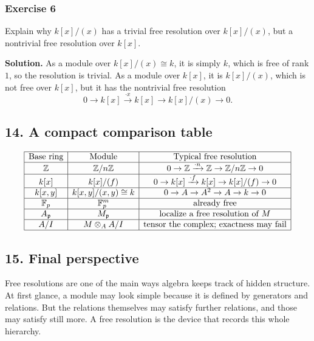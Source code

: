 \documentclass[12pt,a4paper]{article}
\theoremstyle{notespace}
\theoremstyle{definition}
\begin{document}
\subsubsection*{Exercise 6}
Explain why \(k[x]/(x)\) has a trivial free resolution over \(k[x]/(x)\), but a nontrivial free resolution over \(k[x]\).

\textbf{Solution.}
As a module over \(k[x]/(x)\cong k\), it is simply \(k\), which is free of rank \(1\), so the resolution is trivial.
As a module over \(k[x]\), it is \(k[x]/(x)\), which is not free over \(k[x]\), but it has the nontrivial free resolution
\[
0 \longrightarrow k[x] \xrightarrow{\cdot x} k[x] \longrightarrow k[x]/(x) \longrightarrow 0.
\]

\subsection{14. A compact comparison table}

\[
\begin{array}{|c|c|c|}
	\hline
	\text{Base ring} & \text{Module} & \text{Typical free resolution} \\
	\hline
	\mathbb Z & \mathbb Z/n\mathbb Z &
	0 \to \mathbb Z \xrightarrow{\cdot n} \mathbb Z \to \mathbb Z/n\mathbb Z \to 0 \\
	\hline
	k[x] & k[x]/(f) &
	0 \to k[x] \xrightarrow{\cdot f} k[x] \to k[x]/(f) \to 0 \\
	\hline
	k[x,y] & k[x,y]/(x,y)\cong k &
	0 \to A \to A^2 \to A \to k \to 0 \\
	\hline
	\mathbb F_p & \mathbb F_p^m &
	\text{already free} \\
	\hline
	A_{\mathfrak p} & M_{\mathfrak p} &
	\text{localize a free resolution of } M \\
	\hline
	A/I & M\otimes_A A/I &
	\text{tensor the complex; exactness may fail} \\
	\hline
\end{array}
\]

\subsection{15. Final perspective}

Free resolutions are one of the main ways algebra keeps track of hidden structure.
At first glance, a module may look simple because it is defined by generators and relations.
But the relations themselves may satisfy further relations, and those may satisfy still more.
A free resolution is the device that records this whole hierarchy.
\end{document}
